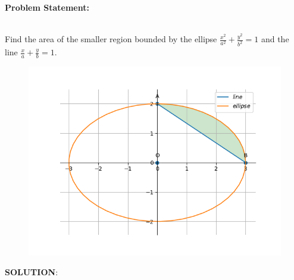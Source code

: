 \documentclass[10pt,a4paper]{report}
\begin{document}
\begin{multicols}{2}

\raggedright \textbf{Problem Statement:}\vspace{2mm}
\raggedright \\
\fi
	Find the area of the smaller region bounded by the ellipse $\frac{x^2}{a^2}+\frac{y^2}{b^2}=1$
and the line $\frac{x}{a}+\frac{y}{b}=1$.\\
\solution
	\begin{figure}[!h]
		\centering
 \includegraphics[width=\columnwidth]{chapters/12/8/3/9/figs/conic_fig.png}    
		\caption{}
		\label{fig:12/8/3/9}
  	\end{figure}
\iffalse
\vspace{5mm}
\raggedright \textbf{SOLUTION}:\vspace{2mm}\\


\end{multicols}
\end{document}
